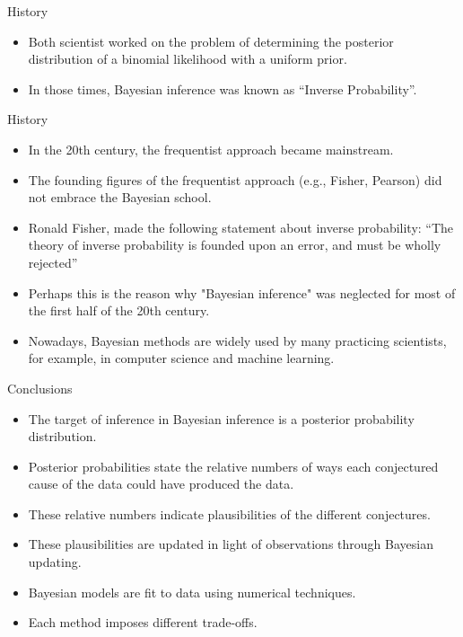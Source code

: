 \documentclass[handout]{beamer}
\begin{document}
\begin{frame}{History}
{\begin{itemize}
\begin{figure}[h!]
\end{figure}

\item Both scientist worked on the problem of determining the posterior distribution of a binomial likelihood with a uniform prior.

\item In those times, Bayesian inference was known as ``Inverse Probability''.


\end{itemize}


} 
\end{frame}



\begin{frame}{History}
\scriptsize{

\begin{itemize}

\item In the 20th century, the frequentist approach became mainstream.

\item The founding figures of the frequentist approach (e.g., Fisher, Pearson) did not embrace the Bayesian school.

\item Ronald Fisher, made the following statement about inverse probability: ``The theory of inverse probability is founded upon an error, and must be wholly rejected'' \cite{fisher1992statistical}

\item Perhaps this is the reason why "Bayesian inference" was neglected for most of the first half of the 20th century.

\item Nowadays, Bayesian methods are widely used by many practicing scientists, for example, in computer science and machine learning.

\end{itemize}


} 
\end{frame}

\begin{frame}{Conclusions}
\scriptsize{

\begin{itemize}
\item The target of inference in Bayesian inference is a posterior probability distribution.\item Posterior probabilities state the relative numbers of ways each conjectured cause of the data could have produced the data. 
\item These relative numbers indicate plausibilities of the different conjectures.
\item These plausibilities are updated in light of observations through Bayesian updating.
\item Bayesian models are fit to data using numerical techniques.
\item Each method imposes different trade-offs.

\end{itemize}


} 
\end{frame}
\end{document}
